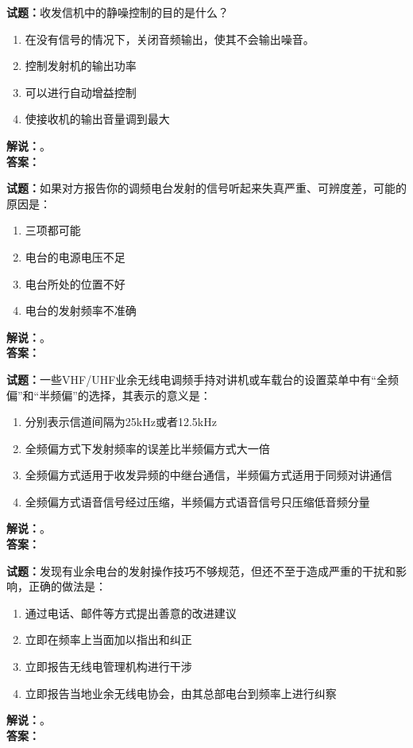 \documentclass{ctexbook}
\begin{document}
\bigskip

\noindent\textbf{试题：}收发信机中的静噪控制的目的是什么？
\begin{enumerate}[leftmargin=3em]
  \item 在没有信号的情况下，关闭音频输出，使其不会输出噪音。
  \item 控制发射机的输出功率
  \item 可以进行自动增益控制
  \item 使接收机的输出音量调到最大
\end{enumerate}
\noindent\textbf{解说：}\textbf{}。\\\noindent\textbf{答案：}

\bigskip

\noindent\textbf{试题：}如果对方报告你的调频电台发射的信号听起来失真严重、可辨度差，可能的原因是：
\begin{enumerate}[leftmargin=3em]
  \item 三项都可能
  \item 电台的电源电压不足
  \item 电台所处的位置不好
  \item 电台的发射频率不准确
\end{enumerate}
\noindent\textbf{解说：}\textbf{}。\\\noindent\textbf{答案：}

\bigskip

\noindent\textbf{试题：}一些VHF/UHF业余无线电调频手持对讲机或车载台的设置菜单中有“全频偏”和“半频偏”的选择，其表示的意义是：
\begin{enumerate}[leftmargin=3em]
  \item 分别表示信道间隔为25\unit{\kHz}或者12.5\unit{\kHz}
  \item 全频偏方式下发射频率的误差比半频偏方式大一倍
  \item 全频偏方式适用于收发异频的中继台通信，半频偏方式适用于同频对讲通信
  \item 全频偏方式语音信号经过压缩，半频偏方式语音信号只压缩低音频分量
\end{enumerate}
\noindent\textbf{解说：}\textbf{}。\\\noindent\textbf{答案：}

\bigskip

\noindent\textbf{试题：}发现有业余电台的发射操作技巧不够规范，但还不至于造成严重的干扰和影响，正确的做法是：
\begin{enumerate}[leftmargin=3em]
  \item 通过电话、邮件等方式提出善意的改进建议
  \item 立即在频率上当面加以指出和纠正
  \item 立即报告无线电管理机构进行干涉
  \item 立即报告当地业余无线电协会，由其总部电台到频率上进行纠察
\end{enumerate}
\noindent\textbf{解说：}\textbf{}。\\\noindent\textbf{答案：}
\end{document}

